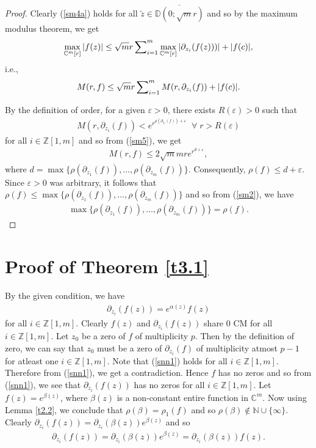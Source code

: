 \documentclass[11pt, reqno]{amsart}
\newcommand{\ol}{\overline}
\numberwithin{equation}{section}
\begin{document}
\begin{proof}
Clearly (\ref{sm4a}) holds for all $\tilde z\in \ol{\mathbb{D}(0;\sqrt{m} r)}$ and so by the maximum modulus theorem, we get
\begin{align*}
 \max\limits_{\mathbb{C}^m[r]} |f(z)|\leq \sqrt{m}r \sideset{}{_{i=1}^m}{\sum}\max\limits_{\mathbb{C}^m[r]}\left|\partial_{z_i}(f(z)))\right|+|f(c)|,
 \end{align*}
i.e.,
\begin{align}\label{sm5} 
M(r,f)\leq \sqrt{m}r \sideset{}{_{i=1}^m}{\sum}M(r,\partial_{z_i}(f))+|f(c)|.
\end{align}

By the definition of order, for a given $\varepsilon>0$, there exists $R(\varepsilon)>0$ such that
\begin{align*}
M(r,\partial_{z_i}(f))<e^{r^{\rho(\partial_{z_i}(f))+\varepsilon}}\;\;\forall\;r>R(\varepsilon)
\end{align*}
for all $i\in\mathbb{Z}[1,m]$ and so from (\ref{sm5}), we get
\begin{align*}
 M(r,f)\leq 2\sqrt{m}m r e^{r^{d+\varepsilon}},
 \end{align*}
where $d=\max\{\rho(\partial_{z_1}(f)),\ldots,\rho(\partial_{z_m}(f))\}$. Consequently, $\rho(f)\leq d+\varepsilon$. Since $\varepsilon>0$ was arbitrary, it follows that $\rho(f)\leq \max\{\rho(\partial_{z_1}(f)),\ldots,\rho(\partial_{z_m}(f))\}$ and so from (\ref{sm2}), we have
\begin{align*}
\max\{\rho(\partial_{z_1}(f)),\ldots,\rho(\partial_{z_m}(f))\}=\rho(f).
\end{align*}
\end{proof}


\section {{\bf Proof of Theorem \ref{t3.1}}}
By the given condition, we have
\begin{align}\label{snn1} 
\partial_{z_i}(f(z))=e^{\alpha(z)}f(z)
\end{align}
for all $i\in\mathbb{Z}[1,m]$. Clearly $f(z)$ and $\partial_{z_i}(f(z))$ share $0$ CM for all $i\in\mathbb{Z}[1,m]$. Let $z_0$ be a zero of $f$ of multiplicity $p$. Then by the definition of zero, we can say that $z_0$ must be a zero of $\partial_{z_i}(f)$ of multiplicity atmost $p-1$ for atleast one $i\in\mathbb{Z}[1,m]$. Note that (\ref{snn1}) holds for all $i\in\mathbb{Z}[1,m]$. Therefore from (\ref{snn1}), we get a contradiction. Hence $f$ has no zeros and so from (\ref{snn1}), we see that $\partial_{z_i}(f(z))$ has no zeros for all $i\in\mathbb{Z}[1,m]$. Let $f(z)=e^{\beta(z)}$, where $\beta(z)$ is a non-constant entire function in $\mathbb{C}^m$. Now using Lemma \ref{t2.2}, we conclude that $\rho(\beta)=\rho_1(f)$ and so $\rho(\beta)\not\in\mathbb{N}\cup\{\infty\}$. Clearly $\partial_{z_i}(f(z))=\partial_{z_i}(\beta(z))e^{\beta(z)}$ and so 
\begin{align}\label{sn0}
\partial_{z_i}(f(z))=\partial_{z_i}(\beta(z))e^{\beta(z)}=\partial_{z_i}(\beta(z))f(z).
\end{align}
\end{document}
